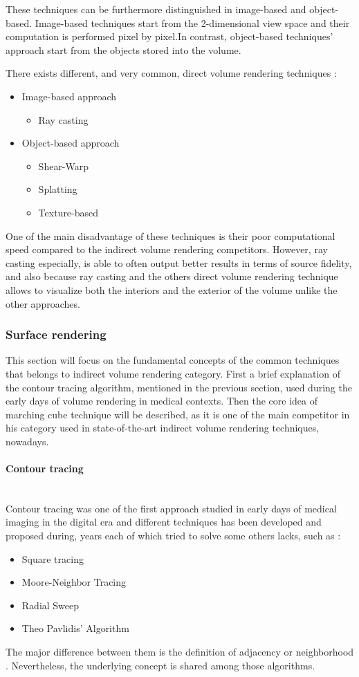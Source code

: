 \documentclass[12pt,a4paper]{extarticle}
\newcommand{\linespace}{\vspace{0pt}}
\newcommand{\myparagraph}[1]{\paragraph{#1}\mbox{}\\}
\begin{document}
These techniques can be furthermore distinguished in image-based and object-based. Image-based techniques start from the 2-dimensional view space and their computation is performed pixel by pixel.In contrast, object-based techniques' approach start from the objects stored into the volume. 

There exists different, and very common, direct volume rendering techniques :
\begin{itemize}
\item Image-based approach
\begin{itemize}
\item Ray casting
\end{itemize}
\item Object-based approach
\begin{itemize}
\item Shear-Warp
\item Splatting
\item Texture-based
\end{itemize}
\end{itemize}

One of the main disadvantage of these techniques is their poor computational speed compared to the indirect volume rendering competitors. However, ray casting especially, is able to often output better results in terms of source fidelity, and also because ray casting and the others direct volume rendering technique allows to visualize both the interiors and the exterior of the volume unlike the other approaches.

\subsubsection{Surface rendering} %
This section will focus on the fundamental concepts of the common techniques that belongs to indirect volume rendering category. First a brief explanation of the contour tracing algorithm, mentioned in the previous section, used during the early days of volume rendering in medical contexts. Then the core idea of marching cube technique will be described, as it is one of the main competitor in his category used in state-of-the-art indirect volume rendering techniques, nowadays.
\myparagraph{Contour tracing}
Contour tracing was one of the first approach studied in early days of medical imaging in the digital era and different techniques has been developed and proposed during, years each of which tried to solve some others lacks, such as :
\begin{itemize}
\item Square tracing \cite{contour}
\item Moore-Neighbor Tracing \cite{contour}
\item Radial Sweep \cite{contour}
\item Theo Pavlidis' Algorithm \cite{Pavlidis1982}
\end{itemize}
The major difference between them is the definition of adjacency or neighborhood \cite{Ghuneim2007Mar}. Nevertheless, the underlying concept is shared among those algorithms.
\linespace
\end{document}

